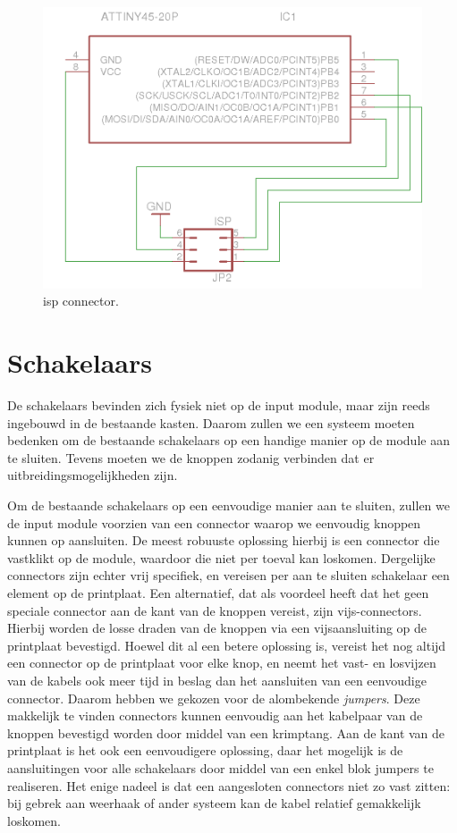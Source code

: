 \begin{figure}
	\includegraphics[width=\textwidth]{afbeeldingen/inputmodule_isp}
	\caption{\acs{isp} connector.}
\end{figure}

\section{Schakelaars}

De schakelaars bevinden zich fysiek niet op de input module, maar zijn reeds ingebouwd in de bestaande kasten. Daarom zullen we een systeem moeten bedenken om de bestaande schakelaars op een handige manier op de module aan te sluiten. Tevens moeten we de knoppen zodanig verbinden dat er uitbreidingsmogelijkheden zijn.

Om de bestaande schakelaars op een eenvoudige manier aan te sluiten, zullen we de input module voorzien van een connector waarop we eenvoudig knoppen kunnen op aansluiten. De meest robuuste oplossing hierbij is een connector die vastklikt op de module, waardoor die niet per toeval kan loskomen. Dergelijke connectors zijn echter vrij specifiek, en vereisen per aan te sluiten schakelaar een element op de printplaat. Een alternatief, dat als voordeel heeft dat het geen speciale connector aan de kant van de knoppen vereist, zijn vijs-connectors. Hierbij worden de losse draden van de knoppen via een vijsaansluiting op de printplaat bevestigd. Hoewel dit al een betere oplossing is, vereist het nog altijd een connector op de printplaat voor elke knop, en neemt het vast- en losvijzen van de kabels ook meer tijd in beslag dan het aansluiten van een eenvoudige connector. Daarom hebben we gekozen voor de alombekende \emph{jumpers}. Deze makkelijk te vinden connectors kunnen eenvoudig aan het kabelpaar van de knoppen bevestigd worden door middel van een krimptang. Aan de kant van de printplaat is het ook een eenvoudigere oplossing, daar het mogelijk is de aansluitingen voor alle schakelaars door middel van een enkel blok jumpers te realiseren. Het enige nadeel is dat een aangesloten connectors niet zo vast zitten: bij gebrek aan weerhaak of ander systeem kan de kabel relatief gemakkelijk loskomen.

